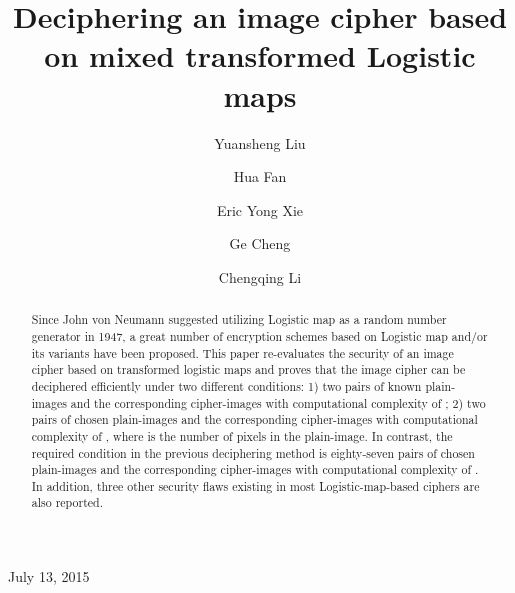 \documentclass{ws-ijbc}
\begin{document}
\catchline{}{}{}{}{} 

\title{Deciphering an image cipher based on mixed transformed Logistic maps}

\author{Yuansheng Liu}
\address{College of Information Engineering,\\
 Xiangtan University, Xiangtan 411105, Hunan, China}

\author{Hua Fan}
\address{Information Security Certification Center, Beijing 100020, China}

\author{Eric Yong Xie}
\address{College of Information Engineering,\\
Xiangtan University, Xiangtan 411105, Hunan, China}

\author{Ge Cheng }
\address{School of Mathematics and Computational Science,\\
Xiangtan University, Xiangtan 411105, Hunan, China}

\author{Chengqing Li}
\address{College of Information Engineering,\\
 Xiangtan University, Xiangtan 411105, Hunan, China\\
 DrChengqingLi@gmail.com}

\maketitle

\begin{history}
July 13, 2015
\end{history}

\begin{abstract}
Since John von Neumann suggested utilizing Logistic map as a random number generator in 1947,
a great number of encryption schemes based on Logistic map and/or its variants have been proposed.
This paper re-evaluates the security of an image cipher based on transformed logistic maps and proves that
the image cipher can be deciphered efficiently under two different conditions:
1) two pairs of known plain-images and the corresponding cipher-images with computational complexity of ;
2) two pairs of chosen plain-images and the corresponding cipher-images with computational complexity of , where  is the number of pixels in the plain-image. In contrast, the required condition in the previous deciphering method is eighty-seven pairs of chosen plain-images and the corresponding cipher-images with computational complexity of . In addition, three other security flaws existing in most Logistic-map-based ciphers are also reported.
\end{abstract}
\end{document}
